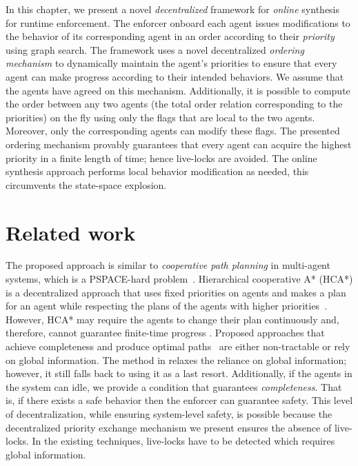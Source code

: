 In this chapter, we present a novel \emph{decentralized} framework for \emph{online} synthesis for runtime enforcement. The enforcer onboard each agent issues modifications to the behavior of its corresponding agent in an order according to their \emph{priority} using graph search.
The framework uses a novel decentralized \emph{ordering mechanism} to dynamically maintain the agent's priorities to ensure that every agent can make progress according to their intended behaviors. We assume that the agents have agreed on this mechanism. Additionally, it is possible to compute the order between any two agents (the total order relation corresponding to the priorities) on the fly using only the flags that are local to the two agents. Moreover, only the corresponding agents can modify these flags. The presented ordering mechanism provably guarantees that every agent can acquire the highest priority in a finite length of time; hence live-locks are avoided. The online synthesis approach performs local behavior modification as needed, this circumvents the state-space explosion.

\section{Related work}
The proposed approach is similar to \emph{cooperative path planning} in multi-agent systems, which is a PSPACE-hard problem~\cite{Hopcroft1984Dec}. Hierarchical cooperative A* (HCA*) is a decentralized approach that uses fixed priorities on agents and makes a plan for an agent while respecting the plans of the agents with higher priorities~\cite{Silver2005Jun}. However, HCA* may require the agents to change their plan continuously and, therefore, cannot guarantee finite-time progress \cite{Silver2005Jun}. Proposed approaches that achieve completeness and produce optimal paths~\cite{Standley2010Jul,Standley2011} are either non-tractable or rely on global information. The method in \cite{Zhang2016} relaxes the reliance on global information; however, it still falls back to using it as a last resort. Additionally, if the agents in the system can idle, we provide a condition that guarantees \emph{completeness}. That is, if there exists a safe behavior then the enforcer can guarantee safety. This level of decentralization, while ensuring system-level safety, is possible because the decentralized priority exchange mechanism we present ensures the absence of live-locks. In the existing techniques, live-locks have to be detected which requires global information. 

